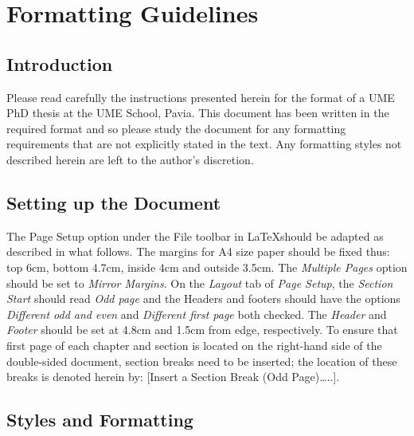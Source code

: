 \chapter{Formatting Guidelines}
\section{Introduction}
Please read carefully the instructions presented herein for the format of a UME PhD thesis at the UME School, Pavia. This document has been written in the required format and so please study the document for any formatting requirements that are not explicitly stated in the text. Any formatting styles not described herein are left to the author’s discretion. 
\section{Setting up the Document}
The Page Setup option under the File toolbar in \LaTeX \space should be adapted as described in what follows. The margins for A4 size paper should be fixed thus: top 6cm, bottom 4.7cm, inside 4cm and outside 3.5cm. The \textit{Multiple Pages} option should be set to \textit{Mirror Margins}. On the \textit{Layout} tab of \textit{Page Setup}, the \textit{Section Start} should read \textit{Odd page} and the Headers and footers should have the options \textit{Different odd and even} and \textit{Different first page} both checked. The \textit{Header} and \textit{Footer} should be set at 4.8cm and 1.5cm from edge, respectively. To ensure that first page of each chapter and section is located on the right-hand side of the double-sided document, section breaks need to be inserted; the location of these breaks is denoted herein by: [Insert a Section Break (Odd Page)…..]. 
\section{Styles and Formatting}

